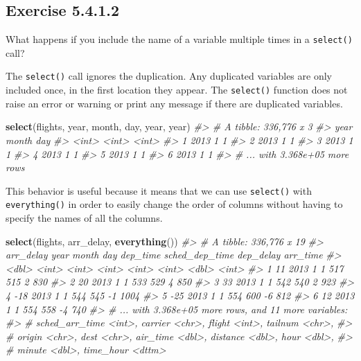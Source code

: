 \documentclass[]{book}
\newenvironment{Shaded}{\begin{snugshade}}{\end{snugshade}}
\newcommand{\CommentTok}[1]{\textcolor[rgb]{0.56,0.35,0.01}{\textit{#1}}}
\newcommand{\KeywordTok}[1]{\textcolor[rgb]{0.13,0.29,0.53}{\textbf{#1}}}
\newcommand{\NormalTok}[1]{#1}
\theoremstyle{plain}
\theoremstyle{remark}
\begin{document}
\hypertarget{exercise-5.4.1.2}{%
\subsection*{\texorpdfstring{Exercise {5.4.1.2}}{Exercise 5.4.1.2}}\label{exercise-5.4.1.2}}

What happens if you include the name of a variable multiple times in a \texttt{select()} call?

The \texttt{select()} call ignores the duplication. Any duplicated variables are only included once, in the first location they appear. The \texttt{select()} function does not raise an error or warning or print any message if there are duplicated variables.

\begin{Shaded}
\begin{Highlighting}[]
\KeywordTok{select}\NormalTok{(flights, year, month, day, year, year)}
\CommentTok{#> # A tibble: 336,776 x 3}
\CommentTok{#>    year month   day}
\CommentTok{#>   <int> <int> <int>}
\CommentTok{#> 1  2013     1     1}
\CommentTok{#> 2  2013     1     1}
\CommentTok{#> 3  2013     1     1}
\CommentTok{#> 4  2013     1     1}
\CommentTok{#> 5  2013     1     1}
\CommentTok{#> 6  2013     1     1}
\CommentTok{#> # ... with 3.368e+05 more rows}
\end{Highlighting}
\end{Shaded}

This behavior is useful because it means that we can use \texttt{select()} with \texttt{everything()}
in order to easily change the order of columns without having to specify the names
of all the columns.

\begin{Shaded}
\begin{Highlighting}[]
\KeywordTok{select}\NormalTok{(flights, arr_delay, }\KeywordTok{everything}\NormalTok{())}
\CommentTok{#> # A tibble: 336,776 x 19}
\CommentTok{#>   arr_delay  year month   day dep_time sched_dep_time dep_delay arr_time}
\CommentTok{#>       <dbl> <int> <int> <int>    <int>          <int>     <dbl>    <int>}
\CommentTok{#> 1        11  2013     1     1      517            515         2      830}
\CommentTok{#> 2        20  2013     1     1      533            529         4      850}
\CommentTok{#> 3        33  2013     1     1      542            540         2      923}
\CommentTok{#> 4       -18  2013     1     1      544            545        -1     1004}
\CommentTok{#> 5       -25  2013     1     1      554            600        -6      812}
\CommentTok{#> 6        12  2013     1     1      554            558        -4      740}
\CommentTok{#> # ... with 3.368e+05 more rows, and 11 more variables:}
\CommentTok{#> #   sched_arr_time <int>, carrier <chr>, flight <int>, tailnum <chr>,}
\CommentTok{#> #   origin <chr>, dest <chr>, air_time <dbl>, distance <dbl>, hour <dbl>,}
\CommentTok{#> #   minute <dbl>, time_hour <dttm>}
\end{Highlighting}
\end{Shaded}
\end{document}
